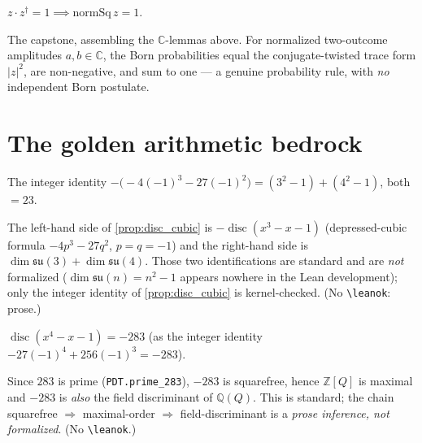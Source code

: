 \begin{lemma}
  \label{lem:unitary}
  \leanok
  $z\cdot z^{\dagger} = 1 \implies \mathrm{normSq}\,z = 1$.
\end{lemma}

\begin{theorem}
  \label{thm:qm_from_q}
  \leanok
  The capstone, assembling the $\mathbb{C}$-lemmas above. For normalized two-outcome amplitudes $a,b\in\mathbb{C}$,
  the Born probabilities equal the conjugate-twisted trace form $|z|^2$, are
  non-negative, and sum to one --- a genuine probability rule, with \emph{no} independent
  Born postulate.
\end{theorem}

\chapter{The golden arithmetic bedrock}

\begin{proposition}
  \label{prop:disc_cubic}
  \leanok
  The integer identity $-\bigl(-4(-1)^3-27(-1)^2\bigr) = (3^2-1)+(4^2-1)$, both $=23$.
\end{proposition}

\begin{corollary}
  The left-hand side of \cref{prop:disc_cubic} is $-\operatorname{disc}(x^3-x-1)$
  (depressed-cubic formula $-4p^3-27q^2$, $p=q=-1$) and the right-hand side is
  $\dim\mathfrak{su}(3)+\dim\mathfrak{su}(4)$. Those two identifications are standard and are
  \emph{not} formalized ($\dim\mathfrak{su}(n)=n^2-1$ appears nowhere in the Lean development);
  only the integer identity of \cref{prop:disc_cubic} is kernel-checked. (No
  \texttt{\textbackslash leanok}: prose.)
\end{corollary}

\begin{proposition}
  \label{prop:disc_quartic}
  \leanok
  $\operatorname{disc}(x^4-x-1) = -283$ (as the integer identity
  $-27(-1)^4+256(-1)^3 = -283$).
\end{proposition}

\begin{corollary}
  Since $283$ is prime (\lstinline{PDT.prime_283}), $-283$ is squarefree, hence $\mathbb{Z}[Q]$
  is maximal and $-283$ is \emph{also} the field discriminant of $\mathbb{Q}(Q)$. This
  is standard; the chain squarefree $\Rightarrow$ maximal-order $\Rightarrow$ field-discriminant
  is a \emph{prose inference, not formalized}. (No \texttt{\textbackslash leanok}.)
\end{corollary}


